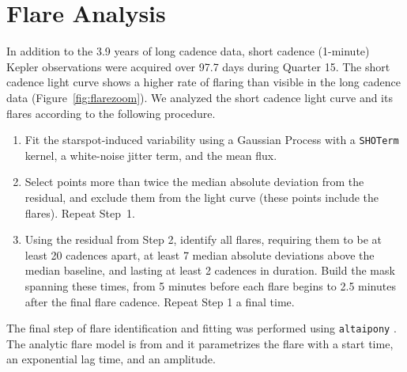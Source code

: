 \documentclass[12pt,modern,twocolumn,tighten]{aastex63}
\begin{document}
\section{Flare Analysis}
\label{app:flare}

In addition to the 3.9 years of long cadence data, short cadence
(1-minute) Kepler observations were acquired over 97.7 days during
Quarter 15.  The short cadence light curve shows a higher rate of
flaring than visible in the long cadence data
(Figure~\ref{fig:flarezoom}).  We analyzed the short cadence light
curve and its flares according to the following procedure.
\begin{enumerate}
  \item Fit the starspot-induced variability using a Gaussian Process
    with a \texttt{SHOTerm} kernel, a white-noise jitter term, and the
    mean flux.
  \item Select points more than twice the median absolute
    deviation from the residual, and exclude them from the light
    curve (these points include the flares).  Repeat Step~1.
  \item Using the residual from Step 2, identify all flares, requiring
    them to be at least 20 cadences apart, at least 7 median absolute
    deviations above the median baseline, and lasting at least 2
    cadences in duration.  Build the mask spanning these times, from 5
    minutes before each flare begins to 2.5 minutes after the final
    flare cadence.  Repeat Step 1 a final time.
\end{enumerate}
The final step of flare identification and fitting was performed using
\texttt{altaipony} \citep{davenport_2016,ilin_flares_2021}.  The
analytic flare model is from \citet{davenport_2014} and it
parametrizes the flare with a start time, an exponential lag time, and
an amplitude.
\end{document}
